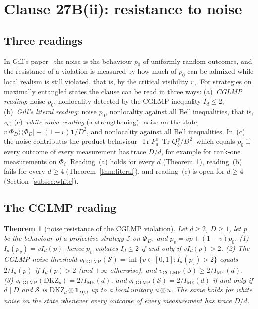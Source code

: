 \documentclass[11pt]{article}
\newtheorem{theorem}{Theorem}
\theoremstyle{remark}
\numberwithin{equation}{section}
\newcommand{\Tr}{\operatorname{Tr}}
\newcommand{\IME}{I_{\mathrm{ME}}}
\newcommand{\one}{\mathbf{1}}
\newcommand{\vc}{v_{\mathrm c}}
\newcommand{\DKZ}{\mathrm{DKZ}}
\begin{document}
\section{Clause 27B(ii): resistance to noise}\label{sec:noise}

\subsection{Three readings}\label{subsec:readings}
In Gill's paper~\cite{Gill} the noise is the behaviour $p_0$ of uniformly random outcomes, and the resistance of a
violation is measured by how much of $p_0$ can be admixed while local realism is still violated, that is, by the
critical visibility $\vc$. For strategies on maximally entangled states the clause can be read in three ways:
(a)~\emph{CGLMP reading}: noise $p_0$, nonlocality detected by the CGLMP inequality $I_d\le2$;
(b)~\emph{Gill's literal reading}: noise $p_0$, nonlocality against all Bell inequalities, that is, $\vc$;
(c)~\emph{white-noise reading} (a strengthening): noise on the state, $v|\Phi_D\rangle\langle\Phi_D|+(1-v)\one/D^2$, and
nonlocality against all Bell inequalities. In~(c) the noise contributes the product behaviour $\Tr P^x_a\,\Tr
Q^y_b/D^2$, which equals $p_0$ if every outcome of every measurement has trace $D/d$, for example for rank-one
measurements on $\Phi_d$. Reading~(a) holds for every $d$ (Theorem~\ref{thm:noisecglmp}), reading~(b) fails for every
$d\ge4$ (Theorem~\ref{thm:literal}), and reading~(c) is open for $d\ge4$ (Section~\ref{subsec:white}).

\subsection{The CGLMP reading}\label{subsec:noisecglmp}

\begin{theorem}[noise resistance of the CGLMP violation]\label{thm:noisecglmp}
Let $d\ge2$, $D\ge1$, let $p$ be the behaviour of a projective strategy $\mathcal S$ on $\Phi_D$, and
$p_v=vp+(1-v)p_0$. \textup{(1)} $I_d(p_v)=vI_d(p)$; hence $p_v$ violates $I_d\le2$ if and only if $vI_d(p)>2$.
\textup{(2)} The CGLMP noise threshold $v_{\mathrm{CGLMP}}(\mathcal S)=\inf\{v\in[0,1]:I_d(p_v)>2\}$ equals $2/I_d(p)$
if $I_d(p)>2$ \textup{(}and $+\infty$ otherwise\textup{)}, and $v_{\mathrm{CGLMP}}(\mathcal S)\ge2/\IME(d)$.
\textup{(3)} $v_{\mathrm{CGLMP}}(\DKZ_d)=2/\IME(d)$, and $v_{\mathrm{CGLMP}}(\mathcal S)=2/\IME(d)$ if and only if $d\mid
D$ and $\mathcal S$ is $\DKZ_d\otimes\one_{D/d}$ up to a local unitary $u\otimes\bar u$. The same holds for white noise
on the state whenever every outcome of every measurement has trace $D/d$.
\end{theorem}
\end{document}
